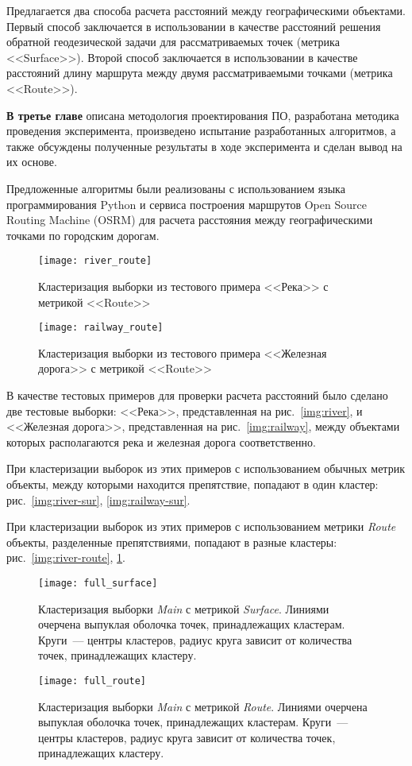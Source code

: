 Предлагается два способа расчета расстояний между географическими объектами. Первый способ заключается в использовании в качестве расстояний решения обратной геодезической задачи для рассматриваемых точек (метрика <<Surface>>). Второй способ заключается в использовании в качестве расстояний длину маршрута между двумя рассматриваемыми точками (метрика <<Route>>).

\textbf{В третье главе} описана методология проектирования ПО, разработана методика проведения эксперимента, произведено испытание разработанных алгоритмов, а также обсуждены полученные результаты в ходе эксперимента и сделан вывод на их основе.

Предложенные алгоритмы были реализованы с использованием языка программирования Python и сервиса построения маршрутов Open Source Routing Machine (OSRM) для расчета расстояния между географическими точками по городским дорогам.

\begin{figure}[b!]
    \centering
    \texttt{[image: river\_route]}\\[1ex]
    \parbox{.9\textwidth}{\caption{Кластеризация выборки из тестового примера <<Река>> с метрикой <<Route>>} \label{img:river-route}}
    \texttt{[image: railway\_route]}\\[1ex]
    \parbox{.9\textwidth}{\caption{Кластеризация выборки из тестового примера <<Железная дорога>> с метрикой <<Route>>} \label{img:railway-route}}
\end{figure}

В качестве тестовых примеров для проверки расчета расстояний было сделано две тестовые выборки: <<Река>>, представленная на рис.~\ref{img:river}, и <<Железная дорога>>, представленная на рис.~\ref{img:railway}, между объектами которых располагаются река и железная дорога соответственно.

При кластеризации выборок из этих примеров с использованием обычных метрик объекты, между которыми находится препятствие, попадают в один кластер: рис.~\ref{img:river-sur}, \ref{img:railway-sur}.

При кластеризации выборок из этих примеров с использованием метрики \emph{Route} объекты, разделенные препятствиями, попадают в разные кластеры: рис.~\ref{img:river-route}, \ref{img:railway-route}.
\begin{figure}[b!]
    \centering
    \texttt{[image: full\_surface]}\\[1ex]
    \parbox{.9\textwidth}{\caption{Кластеризация выборки \emph{Main} с метрикой \emph{Surface}. Линиями очерчена выпуклая оболочка точек, принадлежащих кластерам. Круги~--- центры кластеров, радиус круга зависит от количества точек, принадлежащих кластеру.} \label{img:full-surface}}
    \texttt{[image: full\_route]}\\[1ex]
    \parbox{.9\textwidth}{\caption{Кластеризация выборки \emph{Main} с метрикой \emph{Route}. Линиями очерчена выпуклая оболочка точек, принадлежащих кластерам. Круги~--- центры кластеров, радиус круга зависит от количества точек, принадлежащих кластеру.} \label{img:full-route}}
\end{figure}

